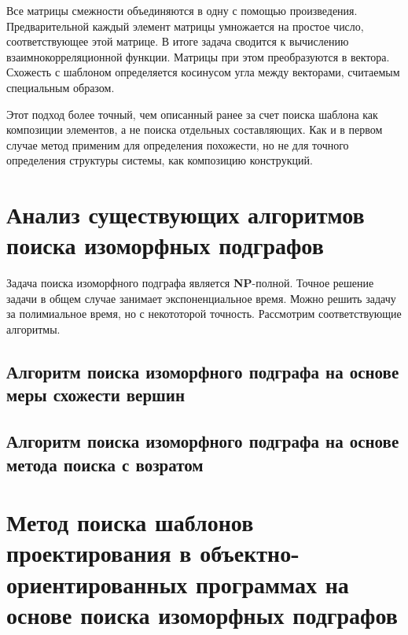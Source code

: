 Все матрицы смежности объединяются в одну с помощью произведения.
Предварительной каждый элемент матрицы умножается на простое число,
соответствующее этой матрице.
В итоге задача сводится к вычислению взаимнокорреляционной функции.
Матрицы при этом преобразуются в вектора.
Схожесть с шаблоном определяется косинусом угла между векторами,
считаемым специальным образом.

Этот подход более точный, чем описанный ранее за счет поиска шаблона как композиции
элементов, а не поиска отдельных составляющих.
Как и в первом случае метод применим для определения похожести,
но не для точного определения структуры системы, как композицию конструкций.

\section{Анализ существующих алгоритмов поиска изоморфных подграфов}

Задача поиска изоморфного подграфа является \textbf{NP}-полной.
Точное решение задачи в общем случае занимает экспоненциальное время.
Можно решить задачу за полимиальное время, но с некототорой точность.
Рассмотрим соответствующие алгоритмы.

\subsection{Алгоритм поиска изоморфного подграфа на основе меры схожести вершин}

\cite{SimilarityGraphVertices}

\subsection{Алгоритм поиска изоморфного подграфа на основе метода поиска с возратом}

\cite{SubgraphIsomorphism}

\section{Метод поиска шаблонов проектирования в объектно-ориентированных программах на основе поиска изоморфных подграфов}

